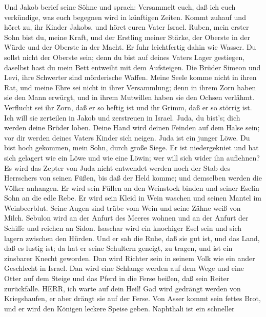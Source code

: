  Und Jakob berief seine Söhne und sprach: Versammelt euch,
daß ich euch verkündige, was euch begegnen wird in künftigen Zeiten.
 Kommt zuhauf und höret zu, ihr Kinder Jakobs, und höret
euren Vater Israel.  Ruben, mein erster Sohn bist du, meine
Kraft, und der Erstling meiner Stärke, der Oberste in der Würde und der
Oberste in der Macht.  Er fuhr leichtfertig dahin wie
Wasser. Du sollst nicht der Oberste sein; denn du bist auf deines Vaters
Lager gestiegen, daselbst hast du mein Bett entweiht mit dem Aufsteigen.
 Die Brüder Simeon und Levi, ihre Schwerter sind mörderische
Waffen.  Meine Seele komme nicht in ihren Rat, und meine
Ehre sei nicht in ihrer Versammlung; denn in ihrem Zorn haben sie den
Mann erwürgt, und in ihrem Mutwillen haben sie den Ochsen verlähmt.
 Verflucht sei ihr Zorn, daß er so heftig ist und ihr Grimm,
daß er so störrig ist. Ich will sie zerteilen in Jakob und zerstreuen in
Israel.  Juda, du bist's; dich werden deine Brüder loben.
Deine Hand wird deinen Feinden auf dem Halse sein; vor dir werden deines
Vaters Kinder sich neigen.  Juda ist ein junger Löwe. Du
bist hoch gekommen, mein Sohn, durch große Siege. Er ist niedergekniet
und hat sich gelagert wie ein Löwe und wie eine Löwin; wer will sich
wider ihn auflehnen?  Es wird das Zepter von Juda nicht
entwendet werden noch der Stab des Herrschers von seinen Füßen, bis daß
der Held komme; und demselben werden die Völker anhangen. 
Er wird sein Füllen an den Weinstock binden und seiner Eselin Sohn an
die edle Rebe. Er wird sein Kleid in Wein waschen und seinen Mantel im
Weinbeerblut.  Seine Augen sind trübe vom Wein und seine
Zähne weiß von Milch.  Sebulon wird an der Anfurt des
Meeres wohnen und an der Anfurt der Schiffe und reichen an Sidon.
 Isaschar wird ein knochiger Esel sein und sich lagern
zwischen den Hürden.  Und er sah die Ruhe, daß sie gut ist,
und das Land, daß es lustig ist; da hat er seine Schultern geneigt, zu
tragen, und ist ein zinsbarer Knecht geworden.  Dan wird
Richter sein in seinem Volk wie ein ander Geschlecht in Israel.
 Dan wird eine Schlange werden auf dem Wege und eine Otter
auf dem Steige und das Pferd in die Ferse beißen, daß sein Reiter
zurückfalle.  HERR, ich warte auf dein Heil! 
Gad wird gedrängt werden von Kriegshaufen, er aber drängt sie auf der
Ferse.  Von Asser kommt sein fettes Brot, und er wird den
Königen leckere Speise geben.  Naphthali ist ein schneller
